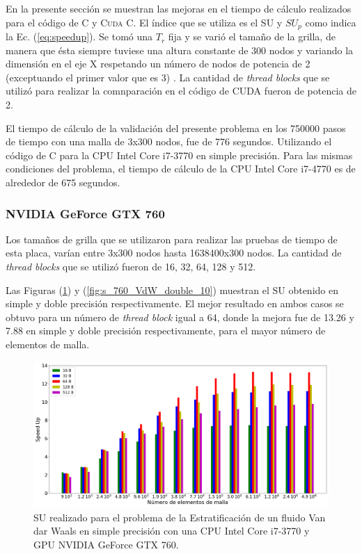 En la presente sección se muestran las mejoras en el tiempo de cálculo realizados para el código de \textsc{C} y \textsc{Cuda C}. El índice que se utiliza es el SU y $SU_p$ como indica la Ec. (\ref{eq:speedup}). Se tomó una $T_r$ fija y se varió el tamaño de la grilla, de manera que ésta siempre tuviese una altura constante de 300 nodos y variando la dimensión en el eje \textsc{X} respetando un número de nodos de potencia de 2 (exceptuando el primer valor que es 3) . La cantidad de \textit{thread blocks} que se utilizó para realizar la comnparación en el código de \textsc{CUDA} fueron de potencia de 2.

El tiempo de cálculo de la validación del presente problema en los 750000 pasos de tiempo con una malla de 3x300 nodos, fue de 776 segundos. Utilizando  el código de \textsc{C} para la CPU Intel Core i7-3770 en simple precisión. Para las mismas condiciones del problema, el tiempo de cálculo de la CPU Intel Core i7-4770 es de alrededor de 675 segundos.

\subsubsection{NVIDIA GeForce GTX 760}

Los tamaños de grilla que se utilizaron para realizar las pruebas de tiempo de esta placa, varían entre 3x300 nodos hasta 1638400x300 nodos. La cantidad de \textit{thread blocks} que se utilizó fueron de 16, 32, 64, 128 y 512.

Las Figuras (\ref{fig:s_760_VdW_simple_10}) y (\ref{fig:s_760_VdW_double_10}) muestran el SU obtenido en simple y doble precisión respectivamente. El mejor resultado en ambos casos se obtuvo para un número de \textit{thread block} igual a 64, donde la mejora fue de 13.26 y 7.88 en simple y doble precisión respectivamente, para el mayor número de elementos de malla.





\begin{figure}[htbp]
	\centering
	\includegraphics[width=\textwidth]{figs_2/cap4/s_760_VdW_simple_10}
	\caption{SU realizado para el problema de la Estratificación de un fluido Van dar Waals en simple precisión con una CPU Intel Core i7-3770 y GPU NVIDIA GeForce GTX 760.} 
	\label{fig:s_760_VdW_simple_10}	
\end{figure}

